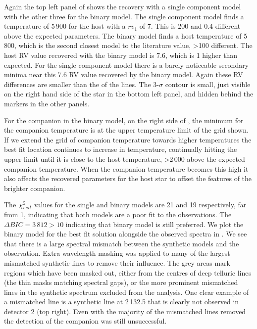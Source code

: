 Again the top left panel of  shows the recovery with a single component model with the other three for the binary model. The single component model finds a temperature of 5\,900\K{} for the host with a \({rv}_1\) of 7\kmps{}. This is 200\K{} and 0.4\kmps{} different above the expected parameters. The binary model finds a host temperature of 5\,800\K{}, which is the second closest model to the literature value, >100\K{} different. The host {RV} value recovered with the binary model is 7.6\kmps{}, which is 1\kmps{} higher than expected.  For the single component model there is a barely noticeable secondary minima near this 7.6\kmps{} {RV} value recovered by the binary model. Again these {RV} differences are smaller than the {\fwhm} of the lines. The 3-\(\sigma\) contour is small, just visible on the right hand side of the star in the bottom left panel, and hidden behind the markers in the other panels.


For the companion in the binary model, on the right side of , the minimum \textchisquared{} for the companion temperature is at the upper temperature limit of the grid shown. If we extend the grid of companion temperature towards higher temperatures the best fit location continues to increase in temperature, continually hitting the upper limit until it is close to the host temperature, >2\,000\K{} above the expected companion temperature. When the companion temperature becomes this high it also affects the recovered parameters for the host star to offset the features of the brighter companion.

The \({\chi}^{2}_{red}\) values for the single and binary models are 21 and 19 respectively, far from 1, indicating that both models are a poor fit to the observations. {\red{} The $\Delta {BIC} = 3\,812 >10$ indicating that binary model is still preferred.} We plot the binary model for the best fit solution alongside the observed spectra in . We see that there is a large spectral mismatch between the synthetic models and the observation. Extra wavelength masking was applied to many of the largest mismatched synthetic lines to remove their influence. The grey areas mark regions which have been masked out, either from the centres of deep telluric lines (the thin masks matching spectral gaps), or the more prominent mismatched lines in the synthetic spectrum excluded from the \textchisquared{} analysis. One clear example of a mismatched line is a synthetic line at 2\,132.5\nm{} that is clearly not observed in detector 2 (top right). Even with the majority of the mismatched lines removed the detection of the companion was still unsuccessful.

